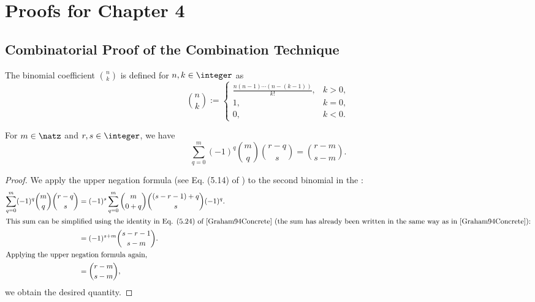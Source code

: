 \section{Proofs for Chapter 4}

\subsection{Combinatorial Proof of the Combination Technique}
\label{sec:proofCombiTechnique}

\begin{definition}
  \label{def:binomialCoefficient}
  The binomial coefficient $\binom{n}{k}$ is defined for
  $n, k \in \integer$ as
  \begin{equation}
    \binom{n}{k}
    :=
    \begin{cases}
      \frac{n (n - 1) \dotsm (n - (k-1))}{k!},&k > 0,\\
      1,&k = 0,\\
      0,&k < 0.
    \end{cases}
  \end{equation}
\end{definition}

\begin{lemma}
  \label{lemma:inclusionExclusionCountingLemma}
  For $m \in \natz$ and $r, s \in \integer$, we have
  \begin{equation}
    \sum_{q=0}^m (-1)^q \binom{m}{q} \binom{r-q}{s}
    = \binom{r-m}{s-m}.
  \end{equation}
\end{lemma}

\begin{proof}
  We apply the upper negation formula
  (see Eq. (5.14) of \cite{Graham94Concrete})
  to the second binomial in the \lhs:
  \begin{subequations}
    \begin{align}
      \sum_{q=0}^m (-1)^q \binom{m}{q} \binom{r-q}{s}
      &= (-1)^s \sum_{q=0}^m \binom{m}{0+q} \binom{(s-r-1)+q}{s} (-1)^q.\\
      \intertext{%
        This sum can be simplified using the identity
        in Eq. (5.24) of \cite{Graham94Concrete}
        (the sum has already been written in the same way as in
        \cite{Graham94Concrete}):%
      }
      &= (-1)^{s+m} \binom{s-r-1}{s-m}.\\
      \intertext{%
        Applying the upper negation formula again,%
      }
      &= \binom{r-m}{s-m},
    \end{align}
  \end{subequations}
  we obtain the desired quantity.
\end{proof}

